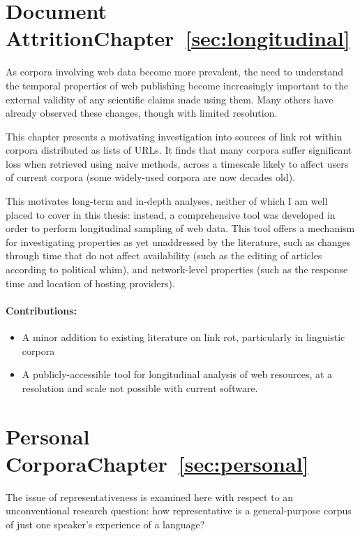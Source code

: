 \section*{Document Attrition\hfill{}Chapter~\ref{sec:longitudinal}}
As corpora involving web data become more prevalent, the need to understand the temporal properties of web publishing become increasingly important to the external validity of any scientific claims made using them.  Many others have already observed these changes, though with limited resolution.

This chapter presents a motivating investigation into sources of link rot within corpora distributed as lists of URLs.  It finds that many corpora suffer significant loss when retrieved using naive methods, across a timescale likely to affect users of current corpora (some widely-used corpora are now decades old).

This motivates long-term and in-depth analyses, neither of which I am well placed to cover in this thesis: instead, a comprehensive tool was developed in order to perform longitudinal sampling of web data.  This tool offers a mechanism for investigating properties as yet unaddressed by the literature, such as changes through time that do not affect availability (such as the editing of articles according to political whim), and network-level properties (such as the response time and location of hosting providers).

\paragraph{Contributions:}
\begin{itemize}
    \item A minor addition to existing literature on link rot, particularly in linguistic corpora
    \item A publicly-accessible tool for longitudinal analysis of web resources, at a resolution and scale not possible with current software.
\end{itemize}

\section*{Personal Corpora\hfill{}Chapter~\ref{sec:personal}}
The issue of representativeness is examined here with respect to an unconventional research question: how representative is a general-purpose corpus of just one speaker's experience of a language?

